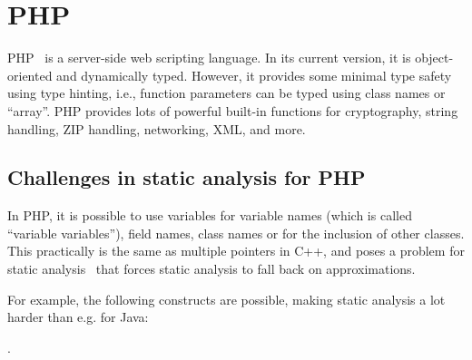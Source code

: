 \chapter{PHP}
\label{php}

PHP~\cite{php-in-action} is a server-side web scripting language. In its current version, it is object-oriented and dynamically typed. However, it provides some minimal type safety using type hinting, i.e., function parameters can be typed using class names or ``array''. PHP provides lots of powerful built-in functions for cryptography, string handling, ZIP handling, networking, XML, and more.

\section{Challenges in static analysis for PHP}

In PHP, it is possible to use variables for variable names (which is called ``variable variables''), field names, class names or for the inclusion of other classes. This practically is the same as multiple pointers in C++, and poses a problem for static analysis~\cite{tamper-resistance} that forces static analysis to fall back on approximations.

For example, the following constructs are possible, making static analysis a lot harder than e.g. for Java:


.

